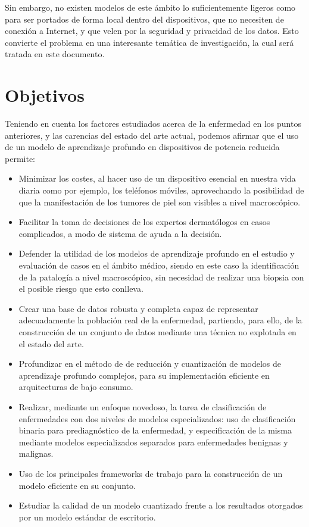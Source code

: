 Sin embargo, no existen modelos de este ámbito lo suficientemente ligeros como para ser portados de forma local dentro del dispositivos, que no necesiten de conexión a Internet, y que velen por la seguridad y privacidad de los datos. Esto convierte el problema en una interesante temática de investigación, la cual será tratada en este documento.

\section{Objetivos}

Teniendo en cuenta los factores estudiados acerca de la enfermedad en los puntos anteriores, y las carencias del estado del arte actual, podemos afirmar que el uso de un modelo de aprendizaje profundo en dispositivos de potencia reducida permite:
\begin{itemize}
	\item Minimizar los costes, al hacer uso de un dispositivo esencial en nuestra vida diaria como por ejemplo, los teléfonos móviles, aprovechando la posibilidad de que la manifestación de los tumores de piel son visibles a nivel macroscópico.
	\item Facilitar la toma de decisiones de los expertos dermatólogos en casos complicados, a modo de sistema de ayuda a la decisión.
	\item Defender la utilidad de los modelos de aprendizaje profundo en el estudio y evaluación de casos en el ámbito médico, siendo en este caso la identificación de la patalogía a nivel macroscópico, sin necesidad de realizar una biopsia con el posible riesgo que esto conlleva.
	\item Crear una base de datos robusta y completa capaz de representar adecuadamente la población real de la enfermedad, partiendo, para ello, de la construcción de un conjunto de datos mediante una técnica no explotada en el estado del arte.
	\item Profundizar en el método de de reducción y cuantización de modelos de aprendizaje profundo complejos, para su implementación eficiente en arquitecturas de bajo consumo.
	\item Realizar, mediante un enfoque novedoso, la tarea de clasificación de enfermedades con dos niveles de modelos especializados: uso de clasificación binaria para prediagnóstico de la enfermedad, y especificación de la misma mediante modelos especializados separados para enfermedades benignas y malignas.
	\item Uso de los principales frameworks de trabajo para la construcción de un modelo eficiente en su conjunto.
	\item Estudiar la calidad de un modelo cuantizado frente a los resultados otorgados por un modelo estándar de escritorio.
\end{itemize}

